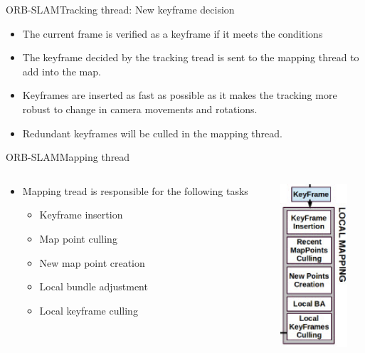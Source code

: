 \documentclass[aspectratio=169]{beamer}
\begin{document}
\begin{frame}{ORB-SLAM}{Tracking thread: New keyframe decision}
    \begin{itemize}
        \item{
        The current frame is verified as a keyframe if it meets the conditions
        }
        \item{
        The keyframe decided by the tracking tread is sent to the mapping thread to add into the map.
        }
        \item{
        Keyframes are inserted as fast as possible as it makes the tracking more robust to change in camera movements and rotations.
        }
        \item{
        Redundant keyframes will be culled in the mapping thread.
        }
    \end{itemize}
\end{frame}
\begin{frame}{ORB-SLAM}{Mapping thread}
    \begin{columns}[T]
\begin{column}{0.8\textwidth}
\begin{itemize}
\item{
Mapping tread is responsible for the following tasks
\begin{itemize}
    \item{
    Keyframe insertion
    }
    \item{
    Map point culling
    }
    \item{
    New map point creation
    }
    \item{
    Local bundle adjustment
    }
    \item{
    Local keyframe culling
    }
\end{itemize}
} 
\end{itemize}
\end{column}
\begin{column}{0.2\textwidth}
\includegraphics[width=2.5cm]{figs/localMapping}
\end{column}
\end{columns}
\end{frame}
\end{document}
